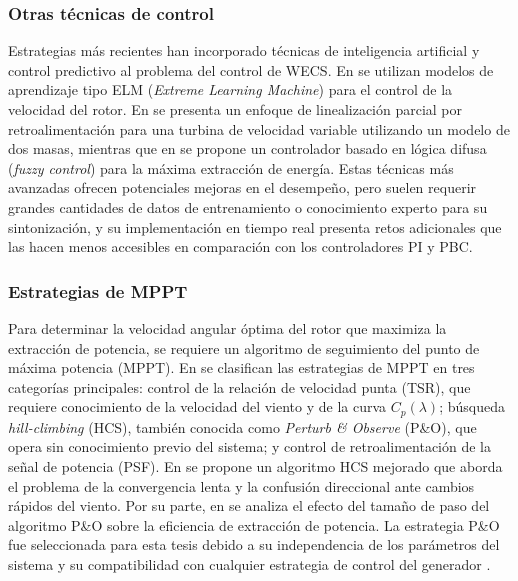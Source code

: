 
\subsubsection*{Otras técnicas de control}
Estrategias más recientes han incorporado técnicas de inteligencia 
artificial y control predictivo al problema del control de WECS. En 
\cite{Jie2020} se utilizan modelos de aprendizaje tipo ELM (\emph{Extreme 
Learning Machine}) para el control de la velocidad del rotor. En 
\cite{Boukhezzar2011} se presenta un enfoque de linealización parcial por 
retroalimentación para una turbina de velocidad variable utilizando un 
modelo de dos masas, mientras que en \cite{Calderaro2008} se propone un 
controlador basado en lógica difusa (\emph{fuzzy control}) para la máxima 
extracción de energía. Estas técnicas más avanzadas ofrecen potenciales 
mejoras en el desempeño, pero suelen requerir grandes cantidades de datos 
de entrenamiento o conocimiento experto para su sintonización, y su 
implementación en tiempo real presenta retos adicionales que las hacen 
menos accesibles en comparación con los controladores PI y PBC.

\subsubsection*{Estrategias de MPPT}
Para determinar la velocidad angular óptima del rotor que maximiza la extracción 
de potencia, se requiere un algoritmo de seguimiento del punto de máxima potencia 
(MPPT). En \cite{nak2013} se clasifican las estrategias de MPPT en tres 
categorías principales: control de la relación de velocidad punta (TSR), 
que requiere conocimiento de la velocidad del viento y de la curva $C_p(\lambda)$; 
búsqueda \emph{hill-climbing} (HCS), también conocida como \emph{Perturb \& 
Observe} (P\&O), que opera sin conocimiento previo del sistema; y control de 
retroalimentación de la señal de potencia (PSF). En \cite{kazmi2011} se propone 
un algoritmo HCS mejorado que aborda el problema de la convergencia lenta y 
la confusión direccional ante cambios rápidos del viento. Por su parte, en 
\cite{xia2013} se analiza el efecto del tamaño de paso del algoritmo P\&O 
sobre la eficiencia de extracción de potencia. La estrategia P\&O fue 
seleccionada para esta tesis debido a su independencia de los parámetros del 
sistema y su compatibilidad con cualquier estrategia de control del generador 
\cite{kazmi2011, wang2004}.
\\

